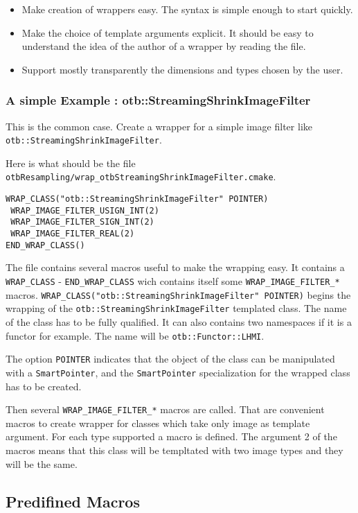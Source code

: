 \begin{itemize}
\item Make creation of wrappers easy. The syntax is simple enough to start quickly.
\item Make the choice of template arguments explicit. It should be easy 
  to understand the idea of the author of a wrapper by reading the file. 
\item Support mostly transparently the dimensions and types chosen by the user.
\end{itemize}

\subsubsection{A simple Example : otb::StreamingShrinkImageFilter}
This is the common case. Create a wrapper for a 
simple image filter like 
\verb$otb::StreamingShrinkImageFilter$. 

Here is what should be the file 
\verb$otbResampling/wrap_otbStreamingShrinkImageFilter.cmake$.

\begin{verbatim}
WRAP_CLASS("otb::StreamingShrinkImageFilter" POINTER)
 WRAP_IMAGE_FILTER_USIGN_INT(2)
 WRAP_IMAGE_FILTER_SIGN_INT(2)
 WRAP_IMAGE_FILTER_REAL(2)
END_WRAP_CLASS()
\end{verbatim}

The file contains several macros useful to make the wrapping easy. It contains 
a \verb$WRAP_CLASS$ - \verb$END_WRAP_CLASS$ wich contains itself some 
\verb$WRAP_IMAGE_FILTER_*$ macros. 
\verb$WRAP_CLASS("otb::StreamingShrinkImageFilter" POINTER)$ begins the wrapping of the 
\verb$otb::StreamingShrinkImageFilter$ templated class.
The name of the class has to be fully qualified.  It can also contains two namespaces if it is 
a functor for example. The name will be \verb$otb::Functor::LHMI$.

The option \verb$POINTER$ indicates that the object of the class can be manipulated with a 
\verb$SmartPointer$, and the  \verb$SmartPointer$ specialization for the wrapped class has to be created.

Then several \verb$WRAP_IMAGE_FILTER_*$ macros are called. That are convenient macros to create
wrapper for classes which take only image as template argument. For each type supported  
a macro is defined. The argument 2 of the macros means that this class will be templtated with 
two image types and they will be the same.


\subsection{Predifined Macros}

